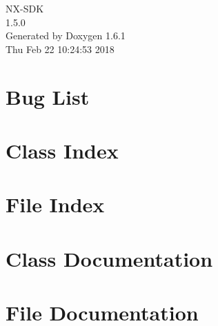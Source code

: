 \documentclass[a4paper]{book}
\begin{document}
\hypersetup{pageanchor=false}
\begin{titlepage}
\vspace*{7cm}
\begin{center}
{\Large NX-\/SDK \\[1ex]\large 1.5.0 }\\
\vspace*{1cm}
{\large Generated by Doxygen 1.6.1}\\
\vspace*{0.5cm}
{\small Thu Feb 22 10:24:53 2018}\\
\end{center}
\end{titlepage}
\clearemptydoublepage
{}
\tableofcontents
\clearemptydoublepage
{}
\hypersetup{pageanchor=true}
\chapter{Bug List}
\label{bug}
\hypertarget{bug}{}

\chapter{Class Index}

\chapter{File Index}

\chapter{Class Documentation}














\chapter{File Documentation}





\printindex
\end{document}
